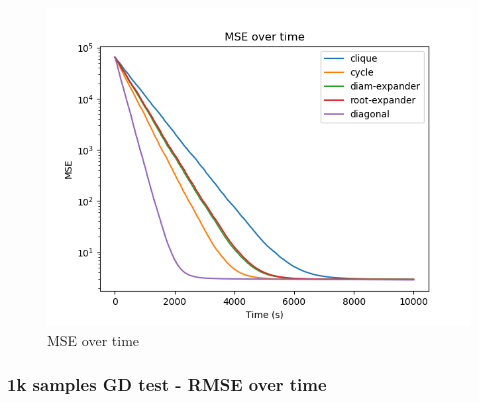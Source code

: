 \documentclass[11pt]{article}
\makeatletter
\def\maxwidth{\ifdim\Gin@nat@width>\linewidth\linewidth
    \else\Gin@nat@width\fi}
\let\Oldincludegraphics\includegraphics
\renewcommand{\includegraphics}[1]{\Oldincludegraphics[width=.8\maxwidth]{#1}}
\makeatother
\begin{document}
\begin{figure}
\centering
\includegraphics{media/img/tests/test_003_1ksamples_classic/3_mse_time.png}
\caption{MSE over time}
\end{figure}

    \subsubsection{1k samples GD test - RMSE over
time}\label{k-samples-gd-test---rmse-over-time}
\end{document}
